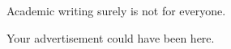 Academic writing surely is not for everyone.

Your advertisement could have been here.




\newpage
\tableofcontents










\newpage
\renewcommand{\chaptermark}[1]{\markboth{\thechapter. \ #1}{}}
\renewcommand{\sectionmark}[1]{\markright{}{}}
\lhead{\fancyplain{}{\leftmark}}
 
